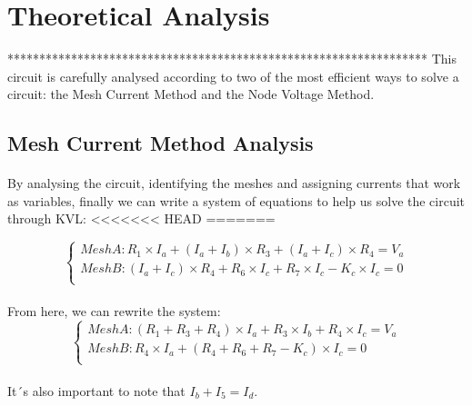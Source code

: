 \section{Theoretical Analysis}
\label{sec:analysis}

******************************************************************
 This circuit is carefully analysed according to two of the most efficient ways to solve a circuit: the Mesh Current Method and the Node Voltage Method.

\subsection{Mesh Current Method Analysis}

\paragraph{}
By analysing the circuit, identifying the meshes and assigning currents that work as variables, finally we can write a system of equations to help us solve the circuit through KVL:
<<<<<<< HEAD
=======

\[
\left\{\begin{matrix}
Mesh A: R_1 \times I_a+(I_a+I_b) \times R_3+(I_a+I_c) \times R_4=V_a\\
Mesh B:	(I_a+I_c) \times R_4+R_6 \times I_c+R_7 \times I_c-K_c \times I_c=0\\
\end{matrix}\right.
\]

\paragraph{}
From here, we can rewrite the system:
\[
\left\{\begin{matrix}
Mesh A: (R_1+R_3+R_4) \times I_a+R_3 \times I_b+R_4 \times I_c=V_a\\
Mesh B: R_4 \times I_a+(R_4+R_6+R_7-K_c) \times I_c=0\\
\end{matrix}\right.
\]

\paragraph{}
It´s also important to note that $ I_b+I_5=I_d $.

